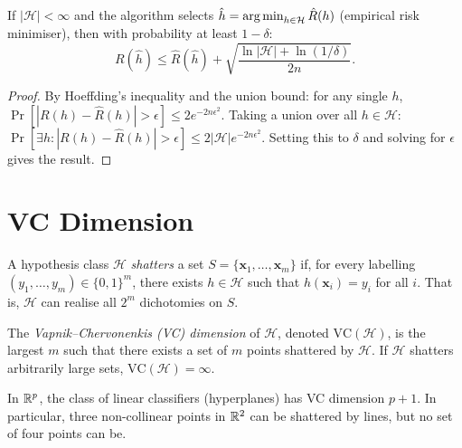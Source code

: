 \begin{theorem}
If $|\mathcal{H}|<\infty$ and the algorithm selects $\hat h=\operatorname*{arg\,min}_{h\in\mathcal{H}}\hat R(h)$ (empirical risk minimiser), then with probability at least $1-\delta$:
\[
  R(\hat h) \leq \hat R(\hat h) + \sqrt{\frac{\ln|\mathcal{H}|+\ln(1/\delta)}{2n}}.
\]
\end{theorem}

\begin{proof}
By Hoeffding's inequality and the union bound: for any single $h$, $\Pr[|R(h)-\hat R(h)|>\epsilon]\leq 2e^{-2n\epsilon^2}$. Taking a union over all $h\in\mathcal{H}$: $\Pr[\exists h:|R(h)-\hat R(h)|>\epsilon]\leq 2|\mathcal{H}|e^{-2n\epsilon^2}$. Setting this to $\delta$ and solving for $\epsilon$ gives the result.
\end{proof}

\section{VC Dimension}

\begin{definition}[Shattering]
A hypothesis class $\mathcal{H}$ \emph{shatters} a set $S=\{\bm{x}_1,\dots,\bm{x}_m\}$ if, for every labelling $(y_1,\dots,y_m)\in\{0,1\}^m$, there exists $h\in\mathcal{H}$ such that $h(\bm{x}_i)=y_i$ for all $i$. That is, $\mathcal{H}$ can realise all $2^m$ dichotomies on $S$.
\end{definition}

\begin{definition}[VC Dimension]
The \emph{Vapnik--Chervonenkis (VC) dimension} of $\mathcal{H}$, denoted $\text{VC}(\mathcal{H})$, is the largest $m$ such that there exists a set of $m$ points shattered by $\mathcal{H}$. If $\mathcal{H}$ shatters arbitrarily large sets, $\text{VC}(\mathcal{H})=\infty$.
\end{definition}

\begin{example}
In $\mathbb{R}^p$, the class of linear classifiers (hyperplanes) has VC dimension $p+1$. In particular, three non-collinear points in $\mathbb{R}^2$ can be shattered by lines, but no set of four points can be.
\end{example}

